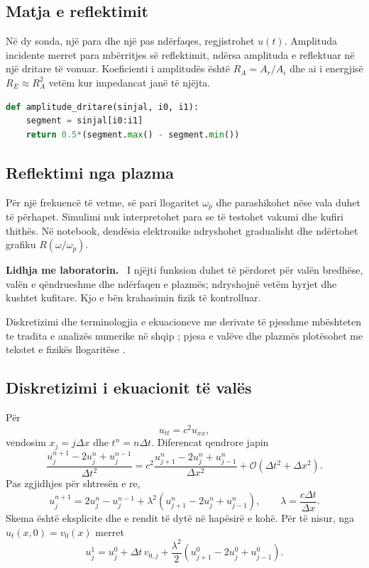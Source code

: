 \documentclass[11pt,oneside,openany]{book}
\newcommand{\Oh}{\mathcal{O}}
\newenvironment{lidhje}{\par\medskip\noindent\textbf{Lidhja me laboratorin.}\ }{\par\medskip}
\begin{document}
\subsection{Matja e reflektimit}
Në dy sonda, një para dhe një pas ndërfaqes, regjistrohet $u(t)$. Amplituda incidente merret para mbërritjes së reflektimit, ndërsa amplituda e reflektuar në një dritare të vonuar. Koeficienti i amplitudës është $R_A=A_r/A_i$ dhe ai i energjisë $R_E\approx R_A^2$ vetëm kur impedancat janë të njëjta.

\begin{lstlisting}[language=Python]
def amplitude_dritare(sinjal, i0, i1):
    segment = sinjal[i0:i1]
    return 0.5*(segment.max() - segment.min())
\end{lstlisting}

\subsection{Reflektimi nga plazma}
Për një frekuencë të vetme, së pari llogaritet $\omega_p$ dhe parashikohet nëse vala duhet të përhapet. Simulimi nuk interpretohet para se të testohet vakumi dhe kufiri thithës. Në notebook, dendësia elektronike ndryshohet gradualisht dhe ndërtohet grafiku $R(\omega/\omega_p)$.

\begin{lidhje}
I njëjti funksion duhet të përdoret për valën bredhëse, valën e qëndrueshme dhe ndërfaqen e plazmës; ndryshojnë vetëm hyrjet dhe kushtet kufitare. Kjo e bën krahasimin fizik të kontrolluar.
\end{lidhje}

Diskretizimi dhe terminologjia e ekuacioneve me derivate të pjesshme mbështeten te tradita e analizës numerike në shqip \cite{hoxha,hanelli,naco}; pjesa e valëve dhe plazmës plotësohet me tekstet e fizikës llogaritëse \cite{giordano,landau}.



\subsection{Diskretizimi i ekuacionit të valës}
Për
\begin{equation}
 u_{tt}=c^2u_{xx},
\end{equation}
vendosim $x_j=j\Delta x$ dhe $t^n=n\Delta t$. Diferencat qendrore japin
\begin{equation}
 \frac{u_j^{n+1}-2u_j^n+u_j^{n-1}}{\Delta t^2}
 =c^2\frac{u_{j+1}^n-2u_j^n+u_{j-1}^n}{\Delta x^2}
 +\Oh(\Delta t^2+\Delta x^2).
\end{equation}
Pas zgjidhjes për shtresën e re,
\begin{equation}
 u_j^{n+1}=2u_j^n-u_j^{n-1}
 +\lambda^2(u_{j+1}^n-2u_j^n+u_{j-1}^n),
 \qquad \lambda=\frac{c\Delta t}{\Delta x}.
\end{equation}
Skema është eksplicite dhe e rendit të dytë në hapësirë e kohë. Për të nisur, nga $u_t(x,0)=v_0(x)$ merret
\begin{equation}
 u_j^1=u_j^0+\Delta t\,v_{0,j}
 +\frac{\lambda^2}{2}(u_{j+1}^0-2u_j^0+u_{j-1}^0).
\end{equation}
\end{document}
